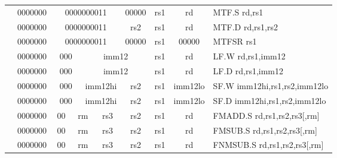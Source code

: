 \begin{table}[p]
\begin{small}
\begin{center}
\begin{tabular}{rcccccccccl}
&
\multicolumn{1}{|c|}{0000000} &
\multicolumn{5}{c|}{0000000011} &
\multicolumn{1}{c|}{00000} &
\multicolumn{1}{c|}{rs1} &
\multicolumn{1}{c|}{rd} & MTF.S rd,rs1 \\
\cline{2-10}
  

&
\multicolumn{1}{|c|}{0000000} &
\multicolumn{5}{c|}{0000000011} &
\multicolumn{1}{c|}{rs2} &
\multicolumn{1}{c|}{rs1} &
\multicolumn{1}{c|}{rd} & MTF.D rd,rs1,rs2 \\
\cline{2-10}
  

&
\multicolumn{1}{|c|}{0000000} &
\multicolumn{5}{c|}{0000000011} &
\multicolumn{1}{c|}{00000} &
\multicolumn{1}{c|}{rs1} &
\multicolumn{1}{c|}{00000} & MTFSR rs1 \\
\cline{2-10}
  

&
\multicolumn{1}{|c|}{0000000} &
\multicolumn{2}{c|}{000} &
\multicolumn{4}{c|}{imm12} &
\multicolumn{1}{c|}{rs1} &
\multicolumn{1}{c|}{rd} & LF.W rd,rs1,imm12 \\
\cline{2-10}
  

&
\multicolumn{1}{|c|}{0000000} &
\multicolumn{2}{c|}{000} &
\multicolumn{4}{c|}{imm12} &
\multicolumn{1}{c|}{rs1} &
\multicolumn{1}{c|}{rd} & LF.D rd,rs1,imm12 \\
\cline{2-10}
  

&
\multicolumn{1}{|c|}{0000000} &
\multicolumn{2}{c|}{000} &
\multicolumn{3}{c|}{imm12hi} &
\multicolumn{1}{c|}{rs2} &
\multicolumn{1}{c|}{rs1} &
\multicolumn{1}{c|}{imm12lo} & SF.W imm12hi,rs1,rs2,imm12lo \\
\cline{2-10}
  

&
\multicolumn{1}{|c|}{0000000} &
\multicolumn{2}{c|}{000} &
\multicolumn{3}{c|}{imm12hi} &
\multicolumn{1}{c|}{rs2} &
\multicolumn{1}{c|}{rs1} &
\multicolumn{1}{c|}{imm12lo} & SF.D imm12hi,rs1,rs2,imm12lo \\
\cline{2-10}
  

&
\multicolumn{1}{|c|}{0000000} &
\multicolumn{1}{c|}{00} &
\multicolumn{2}{c|}{rm} &
\multicolumn{2}{c|}{rs3} &
\multicolumn{1}{c|}{rs2} &
\multicolumn{1}{c|}{rs1} &
\multicolumn{1}{c|}{rd} & FMADD.S rd,rs1,rs2,rs3[,rm] \\
\cline{2-10}
  

&
\multicolumn{1}{|c|}{0000000} &
\multicolumn{1}{c|}{00} &
\multicolumn{2}{c|}{rm} &
\multicolumn{2}{c|}{rs3} &
\multicolumn{1}{c|}{rs2} &
\multicolumn{1}{c|}{rs1} &
\multicolumn{1}{c|}{rd} & FMSUB.S rd,rs1,rs2,rs3[,rm] \\
\cline{2-10}
  

&
\multicolumn{1}{|c|}{0000000} &
\multicolumn{1}{c|}{00} &
\multicolumn{2}{c|}{rm} &
\multicolumn{2}{c|}{rs3} &
\multicolumn{1}{c|}{rs2} &
\multicolumn{1}{c|}{rs1} &
\multicolumn{1}{c|}{rd} & FNMSUB.S rd,rs1,rs2,rs3[,rm] \\
\cline{2-10}
  


\end{tabular}
\end{center}
\end{small}
\end{table}
